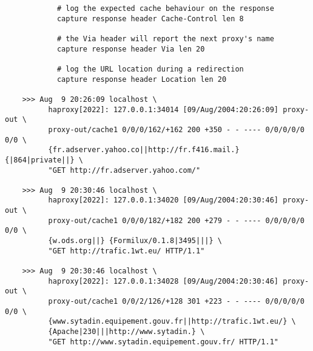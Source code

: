 \begin{verbatim}
            # log the expected cache behaviour on the response
            capture response header Cache-Control len 8

            # the Via header will report the next proxy's name
            capture response header Via len 20

            # log the URL location during a redirection
            capture response header Location len 20

    >>> Aug  9 20:26:09 localhost \
          haproxy[2022]: 127.0.0.1:34014 [09/Aug/2004:20:26:09] proxy-out \
          proxy-out/cache1 0/0/0/162/+162 200 +350 - - ---- 0/0/0/0/0 0/0 \
          {fr.adserver.yahoo.co||http://fr.f416.mail.} {|864|private||} \
          "GET http://fr.adserver.yahoo.com/"

    >>> Aug  9 20:30:46 localhost \
          haproxy[2022]: 127.0.0.1:34020 [09/Aug/2004:20:30:46] proxy-out \
          proxy-out/cache1 0/0/0/182/+182 200 +279 - - ---- 0/0/0/0/0 0/0 \
          {w.ods.org||} {Formilux/0.1.8|3495|||} \
          "GET http://trafic.1wt.eu/ HTTP/1.1"

    >>> Aug  9 20:30:46 localhost \
          haproxy[2022]: 127.0.0.1:34028 [09/Aug/2004:20:30:46] proxy-out \
          proxy-out/cache1 0/0/2/126/+128 301 +223 - - ---- 0/0/0/0/0 0/0 \
          {www.sytadin.equipement.gouv.fr||http://trafic.1wt.eu/} \
          {Apache|230|||http://www.sytadin.} \
          "GET http://www.sytadin.equipement.gouv.fr/ HTTP/1.1"


\end{verbatim}
